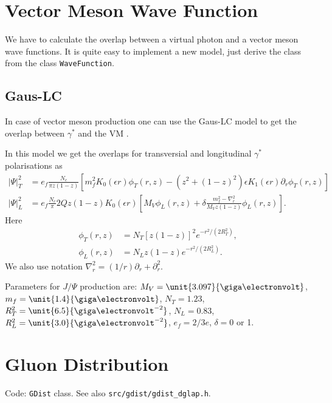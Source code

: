 \documentclass[a4paper,12pt]{article}
\newcommand{\code}[1]{\texttt{#1}}
\begin{document}
\section{Vector Meson Wave Function}
We have to calculate the overlap between a virtual photon and a vector meson wave functions. It is quite easy to implement a new model, just derive the class from the class \code{WaveFunction}.

\subsection{Gaus-LC}
In case of vector meson production one can use the Gaus-LC model to get the overlap between $\gamma^*$ and the VM \cite{Kowalski:2006hc}.

In this model we get the overlaps for transversial and longitudinal $\gamma^*$ polarisations as
\begin{align}
	|\Psi |^2_T &= e_f \frac{N_c}{\pi z(1-z)} \left[ m_f^2 K_0(\epsilon r)\phi_T(r,z) - (z^2 + (1-z)^2) \epsilon K_1(\epsilon r) \partial_r \phi_T(r,z) \right] \\
	|\Psi |^2_L &= e_f \frac{N_c}{\pi} 2Q z (1-z)K_0(\epsilon r) \left[ M_V \phi_L(r,z) + \delta \frac{m_f^2 - \nabla_r^2}{M_V z(1-z)}\phi_L(r,z) \right].
\end{align}
Here
\begin{align}
	\phi_T(r,z) &= N_T \left[ z(1-z)\right]^2 e^{-r^2/(2R_T^2)}, \\
	\phi_L(r,z) &= N_L z(1-z) e^{-r^2/(2R_L^2)}.
\end{align}
We also use notation $\nabla_r^2 = (1/r)\partial_r + \partial_r^2$.

Parameters for $J/\Psi$ production are: $M_V = \unit{3.097}{\giga\electronvolt}$, $m_f = \unit{1.4}{\giga\electronvolt}$, $N_T = 1.23$, $R_T^2 = \unit{6.5}{\giga\electronvolt^{-2}}$, $N_L=0.83$, $R_L^2 = \unit{3.0}{\giga\electronvolt^{-2}}$, $e_f = 2/3 e$, $\delta = 0$ or 1.


\section{Gluon Distribution}
\label{gdist}
Code: \code{GDist} class. See also \code{src/gdist/gdist\_dglap.h}.


\end{document}

